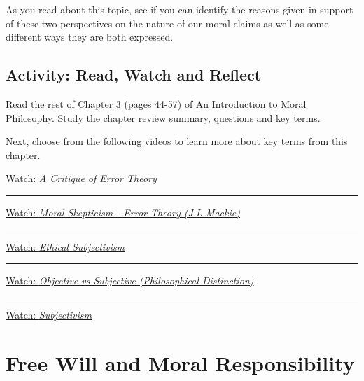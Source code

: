 \documentclass[
]{book}
\begin{document}
As you read about this topic, see if you can identify the reasons given in support of these two perspectives on the nature of our moral claims as well as some different ways they are both expressed.

\hypertarget{activity-read-watch-and-reflect-2}{%
\subsection*{Activity: Read, Watch and Reflect}\label{activity-read-watch-and-reflect-2}}

\begin{reflect}
Read the rest of Chapter 3 (pages 44-57) of An Introduction to Moral Philosophy. Study the chapter review summary, questions and key terms.

Next, choose from the following videos to learn more about key terms from this chapter.

\href{https://www.youtube.com/watch?v=WkVR99xX5XI}{Watch: \emph{A Critique of Error Theory}}

\begin{center}\rule{0.5\linewidth}{0.5pt}\end{center}

\href{https://www.youtube.com/watch?v=ycfRRJAkJLA}{Watch: \emph{Moral Skepticism - Error Theory (J.L Mackie)}}

\begin{center}\rule{0.5\linewidth}{0.5pt}\end{center}

\href{https://www.youtube.com/watch?v=7E3_kVg4sbY}{Watch: \emph{Ethical Subjectivism}}

\begin{center}\rule{0.5\linewidth}{0.5pt}\end{center}

\href{https://www.youtube.com/watch?v=jlutlCrVQN4}{Watch: \emph{Objective vs Subjective (Philosophical Distinction)}}

\begin{center}\rule{0.5\linewidth}{0.5pt}\end{center}

\href{https://www.youtube.com/watch?v=UMUy9WX6sRQ}{Watch: \emph{Subjectivism}}
\end{reflect}

\hypertarget{free-will-and-moral-responsibility}{%
\section{Free Will and Moral Responsibility}\label{free-will-and-moral-responsibility}}
\end{document}
